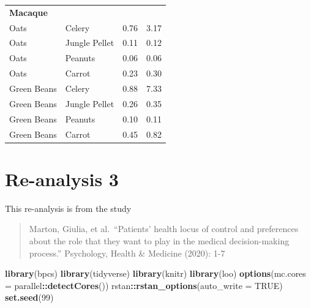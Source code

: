 \documentclass[
]{book}
\newenvironment{Shaded}{\begin{snugshade}}{\end{snugshade}}
\newcommand{\DataTypeTok}[1]{\textcolor[rgb]{0.13,0.29,0.53}{#1}}
\newcommand{\DecValTok}[1]{\textcolor[rgb]{0.00,0.00,0.81}{#1}}
\newcommand{\KeywordTok}[1]{\textcolor[rgb]{0.13,0.29,0.53}{\textbf{#1}}}
\newcommand{\NormalTok}[1]{#1}
\newcommand{\OperatorTok}[1]{\textcolor[rgb]{0.81,0.36,0.00}{\textbf{#1}}}
\newcommand{\OtherTok}[1]{\textcolor[rgb]{0.56,0.35,0.01}{#1}}
\begin{document}
\begin{table}
\begin{tabular}[t]{llrr}
\multicolumn{4}{l}{\textbf{Macaque}}\\
\hspace{1em}Oats & Celery & 0.76 & 3.17\\
\hspace{1em}Oats & Jungle Pellet & 0.11 & 0.12\\
\hspace{1em}Oats & Peanuts & 0.06 & 0.06\\
\hspace{1em}Oats & Carrot & 0.23 & 0.30\\
\hspace{1em}Green Beans & Celery & 0.88 & 7.33\\
\hspace{1em}Green Beans & Jungle Pellet & 0.26 & 0.35\\
\hspace{1em}Green Beans & Peanuts & 0.10 & 0.11\\
\hspace{1em}Green Beans & Carrot & 0.45 & 0.82\\
\bottomrule
\end{tabular}
\end{table}

\hypertarget{studyIII}{%
\chapter{Re-analysis 3}\label{studyIII}}

This re-analysis is from the study

\begin{quote}
Marton, Giulia, et al.~``Patients' health locus of control and preferences about the role that they want to play in the medical decision-making process.'' Psychology, Health \& Medicine (2020): 1-7
\end{quote}

\begin{Shaded}
\begin{Highlighting}[]
\KeywordTok{library}\NormalTok{(bpcs)}
\KeywordTok{library}\NormalTok{(tidyverse)}
\KeywordTok{library}\NormalTok{(knitr)}
\KeywordTok{library}\NormalTok{(loo)}
\KeywordTok{options}\NormalTok{(}\DataTypeTok{mc.cores =}\NormalTok{ parallel}\OperatorTok{::}\KeywordTok{detectCores}\NormalTok{())}
\NormalTok{rstan}\OperatorTok{::}\KeywordTok{rstan_options}\NormalTok{(}\DataTypeTok{auto_write =} \OtherTok{TRUE}\NormalTok{)}
\KeywordTok{set.seed}\NormalTok{(}\DecValTok{99}\NormalTok{)}
\end{Highlighting}
\end{Shaded}
\end{document}
